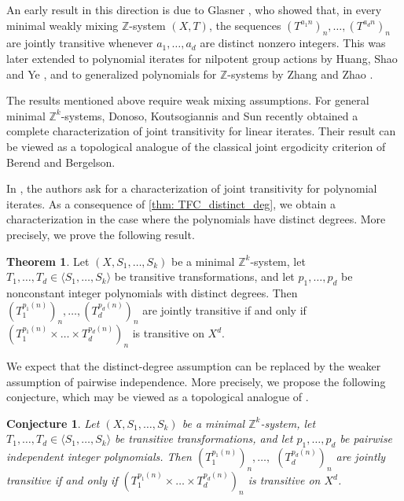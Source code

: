 \documentclass[11pt,reqno]{amsart}
\newcommand{\Z}{\mathbb{Z}}
\newtheorem{conjecture}[conjecture]{Conjecture}
\theoremstyle{definition}
\newtheorem{maintheorem}{Theorem}
\theoremstyle{remark}
\begin{document}
An early result in this direction is due to Glasner \cite{Glasner_top_erg_decomposition:1994}, who showed that, in every minimal weakly mixing $\mathbb Z$-system $(X,T)$, the sequences $(T^{a_1n})_n,\dots,(T^{a_d n})_n$ are jointly transitive whenever $a_1,\dots,a_d$ are distinct nonzero integers. This was later extended to polynomial iterates for nilpotent group actions by Huang, Shao and Ye \cite{Huang_Shao_Ye_top_correspondence_multiple_averages:2019}, and to generalized polynomials for $\mathbb Z$-systems by Zhang and Zhao \cite{Zhang_Zhao_topological_mult_rec_WM_GP:2021}.

The results mentioned above require weak mixing assumptions. For general minimal $\mathbb Z^k$-systems, Donoso, Koutsogiannis and Sun \cite{Donoso_Koutsogiannis_Sun_joint_transitivity:2025} recently obtained a complete characterization of joint transitivity for linear iterates. Their result can be viewed as a topological analogue of the classical joint ergodicity criterion of Berend and Bergelson.

In \cite[Problem 1.8]{Donoso_Koutsogiannis_Sun_joint_transitivity:2025}, the authors ask for a characterization of joint transitivity for polynomial iterates. As a consequence of \cref{thm: TFC_distinct_deg}, we obtain a characterization in the case where the polynomials have distinct degrees. More precisely, we prove the following result.\begin{maintheorem}\label{thm:B}
    Let $(X,S_1,\dots,S_k)$ be a minimal $\Z^k$-system, let $T_1,\dots,T_d\in \langle S_1,\dots,S_k\rangle$ be transitive transformations, and let $p_1,\dots,p_d$ be nonconstant integer polynomials with distinct degrees. Then $(T_1^{p_1(n)})_{n},\dots,(T_d^{p_d(n)})_{n}$ are jointly transitive if and only if $(T_1^{p_1(n)}\times \dots\times T_{d}^{p_{d}(n)})_{n}$ is transitive on $X^d$.
\end{maintheorem}

We expect that the distinct-degree assumption can be replaced by the weaker assumption of pairwise independence. More precisely, we propose the following conjecture, which may be viewed as a topological analogue of {\cite[Theorem 2.16]{Frantzikinakis_Kuca_joint_erg_comm_poly:2025}}.
\begin{conjecture}
    Let $(X,S_1,\dots,S_k)$ be a minimal $\Z^k$-system, let $T_1,\dots,T_d\in \langle S_1,\dots,S_k\rangle$ be transitive transformations, and let $p_1,\dots,p_d$ be pairwise independent integer polynomials. Then $(T_1^{p_1(n)})_{n},\dots,$ $(T_d^{p_d(n)})_{n}$ are jointly transitive if and only if $(T_1^{p_1(n)}\times \dots\times T_{d}^{p_{d}(n)})_{n}$ is transitive on $X^d$.
\end{conjecture}
\end{document}
